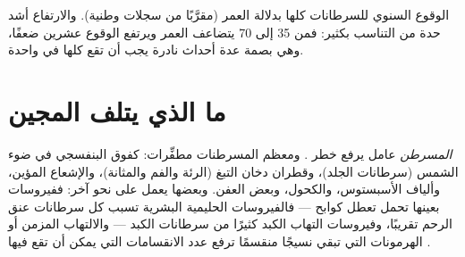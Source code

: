 \begin{omfigure}

{\small الوقوع السنوي للسرطانات كلها بدلالة العمر (مقرَّبًا من سجلات
وطنية). والارتفاع أشد حدة من التناسب بكثير: فمن 35 إلى 70 يتضاعف
العمر ويرتفع الوقوع عشرين ضعفًا، وهي بصمة عدة أحداث نادرة يجب أن تقع
كلها في  واحدة.}
\end{omfigure}

\section{ما الذي يتلف المجين}

\begin{definition}[المسرطن]\label{def:g11:cancer:carcinogen}
\emph{المسرطن} عامل يرفع خطر . ومعظم المسرطنات
مطفِّرات: كفوق البنفسجي في ضوء الشمس (سرطانات الجلد)، وقطران دخان
التبغ (الرئة والفم والمثانة)، والإشعاع المؤين، وألياف الأسبستوس،
والكحول، وبعض العفن. وبعضها يعمل على نحو آخر: ففيروسات بعينها تحمل
 تعطل كوابح  --- فالفيروسات الحليمية البشرية تسبب كل
سرطانات عنق الرحم تقريبًا، وفيروسات التهاب الكبد كثيرًا من سرطانات
الكبد --- والالتهاب المزمن أو الهرمونات التي تبقي نسيجًا منقسمًا ترفع
عدد الانقسامات التي يمكن أن تقع فيها .
\end{definition}

